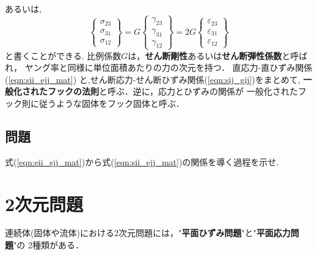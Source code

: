 \documentclass[10pt,a4j]{jarticle}
\begin{document}
あるいは,
\begin{equation}
	\left\{ 
		\begin{array}{*{20}{c}}
		\sigma_{23}\\
		\sigma_{31}\\
		\sigma_{12}
		\end{array}
	\right\} 
	=
	G
	\left\{
		\begin{array}{*{20}{c}}
		\gamma_{23}\\
		\gamma_{31}\\
		\gamma_{12}
		\end{array}
	\right\}
	=
	2G
	\left\{
		\begin{array}{*{20}{c}}
		\varepsilon_{23}\\
		\varepsilon_{31}\\
		\varepsilon_{12}
		\end{array}
	\right\}
	\label{eqn:sij_gij}
\end{equation}
と書くことができる.
比例係数$G$は，{\bf せん断剛性}あるいは{\bf せん断弾性係数}と呼ばれ，
ヤング率と同様に単位面積あたりの力の次元を持つ．
直応力-直ひずみ関係(\ref{eqn:sii_ejj_mat})
と,せん断応力-せん断ひずみ関係(\ref{eqn:sij_gij})をまとめて,
{\bf 一般化されたフックの法則}と呼ぶ．逆に，応力とひずみの関係が
一般化されたフック則に従うような固体をフック固体と呼ぶ．
\subsection{問題}
式(\ref{eqn:eii_sjj_mat})から式(\ref{eqn:sii_ejj_mat})の関係を導く過程を示せ. 
\section{2次元問題}
連続体(固体や流体)における2次元問題には，"{\bf 平面ひずみ問題}"と"{\bf 平面応力問題}"の
2種類がある．
\end{document}
